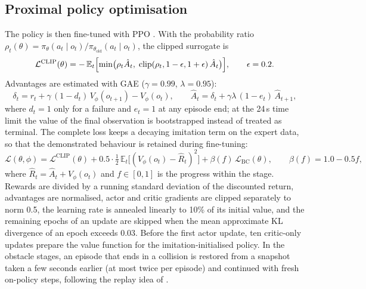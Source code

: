 \subsection{Proximal policy optimisation}
The policy is then fine-tuned with PPO \cite{schulman2017proximal}. With the probability ratio
$\rho_t(\theta) = \pi_\theta(a_t\mid o_t)/\pi_{\theta_{\mathrm{old}}}(a_t\mid o_t)$, the clipped surrogate is
\begin{equation}
  \mathcal{L}^{\mathrm{CLIP}}(\theta) = -\,\mathbb{E}_t\Bigl[\min\bigl(\rho_t\hat A_t,\;
  \operatorname{clip}(\rho_t, 1-\epsilon, 1+\epsilon)\,\hat A_t\bigr)\Bigr],\qquad \epsilon = 0.2 .
  \label{eq:ppo}
\end{equation}
Advantages are estimated with GAE \cite{schulman2016gae} ($\gamma = 0.99$, $\lambda = 0.95$):
\begin{equation}
  \delta_t = r_t + \gamma\,(1-d_t)\,V_\phi(o_{t+1}) - V_\phi(o_t), \qquad
  \hat A_t = \delta_t + \gamma\lambda\,(1 - e_t)\,\hat A_{t+1},
  \label{eq:gae}
\end{equation}
where $d_t = 1$ only for a failure and $e_t = 1$ at any episode end; at the 24\,s time limit the value of the
final observation is bootstrapped instead of treated as terminal. The complete loss keeps
a decaying imitation term on the expert data, so that the demonstrated behaviour is retained during fine-tuning:
\begin{equation}
  \mathcal{L}(\theta,\phi) = \mathcal{L}^{\mathrm{CLIP}}(\theta) + 0.5\cdot\tfrac{1}{2}\,\mathbb{E}_t\bigl[(V_\phi(o_t)-\hat R_t)^2\bigr]
  + \beta(f)\,\mathcal{L}_{\mathrm{BC}}(\theta), \qquad \beta(f) = 1.0 - 0.5f,
  \label{eq:loss}
\end{equation}
where $\hat R_t = \hat A_t + V_\phi(o_t)$ and $f\in[0,1]$ is the progress within the stage. Rewards are divided
by a running standard deviation of the discounted return, advantages are normalised, actor and critic
gradients are clipped separately to norm 0.5, the learning rate is annealed linearly to 10\% of its initial
value, and the remaining epochs of an update are skipped when the mean approximate KL divergence of an epoch
exceeds 0.03. Before the first actor update, ten critic-only updates
prepare the value function for the imitation-initialised policy. In the obstacle stages, an episode that ends
in a collision is restored from a snapshot taken a few seconds earlier (at most twice per episode) and continued
with fresh on-policy steps, following the replay idea of \cite{huang2024collision}.

